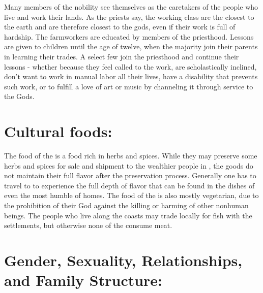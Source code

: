 \documentclass[blue]{GL2020}
\begin{document}
Many members of the nobility see themselves as the caretakers of the people who live and work their lands.  As the priests say, the working class are the closest to the earth and are therefore closest to the gods, even if their work is full of hardship.  The farmworkers are educated by members of the priesthood.  Lessons are given to children until the age of twelve, when the majority join their parents in learning their trades.  A select few join the priesthood and continue their lessons - whether because they feel called to the work, are scholastically inclined, don't want to work in manual labor all their lives, have a disability that prevents such work, or to fulfill a love of art or music by channeling it through service to the Gods.

\section*{Cultural foods:}

The food of the \pFarm{} is a food rich in herbs and spices.  While they may preserve some herbs and spices for sale and shipment to the wealthier people in \pTech{}, the goods do not maintain their full flavor after the preservation process.  Generally one has to travel to \pFarm{} to experience the full depth of flavor that can be found in the dishes of even the most humble of homes.  The food of the \pFarmers{} is also mostly vegetarian, due to the prohibition of their God against the killing or harming of other nonhuman beings.  The people who live along the coasts may trade locally for fish with the \pShip{} settlements, but otherwise none of the \pFarm{} consume meat.


\section*{Gender, Sexuality, Relationships, and Family Structure:}
\end{document}
